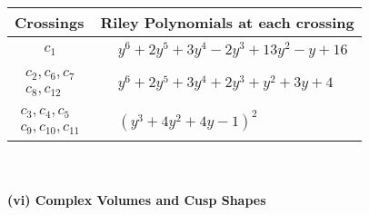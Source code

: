 \documentclass[1p]{elsarticle_modified}
\theoremstyle{definition}
\begin{document}
\begin{tabular}{m{50pt}|m{274pt}}
Crossings & \hspace{64pt}Riley Polynomials at each crossing \\
\hline $$\begin{aligned}c_{1}\end{aligned}$$&$\begin{aligned}
&y^6+2 y^5+3 y^4-2 y^3+13 y^2- y+16
\end{aligned}$\\
\hline $$\begin{aligned}c_{2},c_{6},c_{7}\\c_{8},c_{12}\end{aligned}$$&$\begin{aligned}
&y^6+2 y^5+3 y^4+2 y^3+y^2+3 y+4
\end{aligned}$\\
\hline $$\begin{aligned}c_{3},c_{4},c_{5}\\c_{9},c_{10},c_{11}\end{aligned}$$&$\begin{aligned}
&(y^3+4 y^2+4 y-1)^2
\end{aligned}$\\
\hline
\end{tabular}\\~\\
\newpage\flushleft \textbf{(vi) Complex Volumes and Cusp Shapes}
\end{document}
